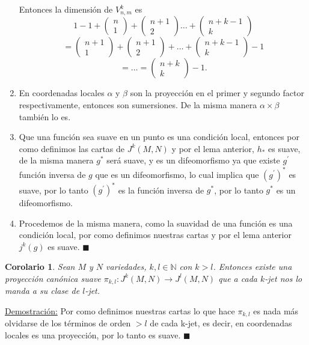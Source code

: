 \documentclass{report}
\newtheorem{coro}[theorem]{Corolario}
\theoremstyle{definition}
\begin{document}
\begin{enumerate}
Entonces la dimensi\'on de $V_{n,m}^k $ es $$1 - 1 + \begin{pmatrix} n \\ 1 \end{pmatrix} + \begin{pmatrix} n +1 \\ 2 \end{pmatrix} \dots +\begin{pmatrix} n + k -1 \\ k \end{pmatrix} $$
$$= \begin{pmatrix} n + 1 \\ 1 \end{pmatrix} + \begin{pmatrix} n + 1 \\ 2 \end{pmatrix} + \dots + \begin{pmatrix} n + k - 1 \\ k \end{pmatrix} - 1 $$
$$= \dots = \begin{pmatrix} n + k \\ k \end{pmatrix} - 1 .$$

\item En coordenadas locales $\alpha $ y $\beta$ son la proyecci\'on en el primer y segundo factor respectivamente, entonces son sumersiones. De la misma manera $\alpha \times \beta$ tambi\'en lo es.

\item Que una funci\'on sea suave en un punto es una condici\'on local, entonces por como definimos las cartas de $J^k (M,N)$ y por el lema anterior, $h_\ast$ es suave, de la misma manera $g^\ast$ ser\'a suave, y es un difeomorfismo ya que existe $g^\prime$ funci\'on inversa de $g$ que es un difeomorfismo, lo cual implica que $(g^\prime)^\ast$ es suave, por lo tanto $(g^\prime)^\ast$ es la funci\'on inversa de $g^\ast$, por lo tanto $g^\ast$ es un difeomorfismo.

\item Procedemos de la misma manera, como la suavidad de una funci\'on es una condici\'on local, por como definimos nuestras cartas y por el lema anterior $j^k(g)$ es suave. $\blacksquare$

\end{enumerate}

\begin{coro}
Sean $M$ y $N$ variedades, $k, l \in \mathbb{N}$ con $k > l$. Entonces existe una proyecci\'on can\'onica suave $\pi_{k , l}: J^k (M , N) \to J^l (M, N)$ que a cada $k$-jet nos lo manda a su clase de $l$-jet.
\end{coro}
\underline{Demostraci\'on:} Por como definimos nuestras cartas lo que hace $\pi_{k, l}$ es nada m\'as olvidarse de los t\'erminos de orden $> l$ de cada k-jet, es decir, en coordenadas locales es una proyecci\'on, por lo tanto es suave. $\blacksquare$
\end{document}
